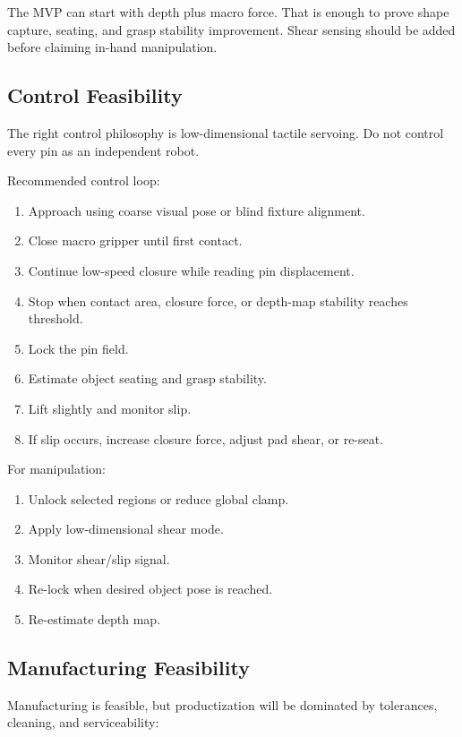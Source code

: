 \documentclass[11pt]{article}
\begin{document}
The MVP can start with depth plus macro force. That is enough to prove shape capture, seating, and grasp stability improvement. Shear sensing should be added before claiming in-hand manipulation.

\subsection{Control Feasibility}

The right control philosophy is low-dimensional tactile servoing. Do not control every pin as an independent robot.

Recommended control loop:

\begin{enumerate}[leftmargin=*]
  \item Approach using coarse visual pose or blind fixture alignment.
  \item Close macro gripper until first contact.
  \item Continue low-speed closure while reading pin displacement.
  \item Stop when contact area, closure force, or depth-map stability reaches threshold.
  \item Lock the pin field.
  \item Estimate object seating and grasp stability.
  \item Lift slightly and monitor slip.
  \item If slip occurs, increase closure force, adjust pad shear, or re-seat.
\end{enumerate}

For manipulation:

\begin{enumerate}[leftmargin=*]
  \item Unlock selected regions or reduce global clamp.
  \item Apply low-dimensional shear mode.
  \item Monitor shear/slip signal.
  \item Re-lock when desired object pose is reached.
  \item Re-estimate depth map.
\end{enumerate}

\subsection{Manufacturing Feasibility}

Manufacturing is feasible, but productization will be dominated by tolerances, cleaning, and serviceability:
\end{document}
